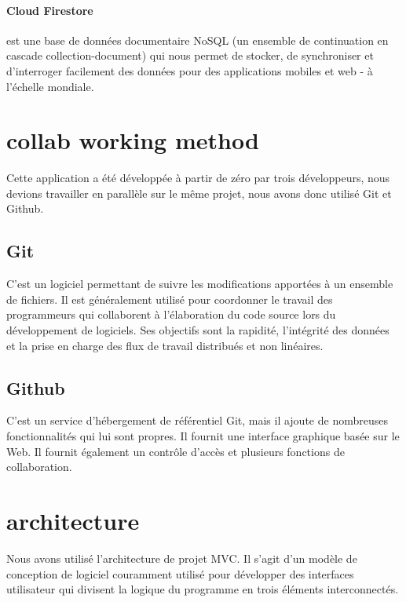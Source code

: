 \documentclass[a4paper, 10p]{report}
\begin{document}
				\paragraph*{Cloud Firestore} est une base de données documentaire NoSQL (un ensemble de continuation en cascade collection-document) qui nous permet de stocker, de synchroniser et d'interroger facilement des données pour des applications mobiles et web - à l'échelle mondiale.
	\section{collab working method}
		Cette application a été développée à partir de zéro par trois développeurs, nous devions travailler en parallèle sur le même projet, nous avons donc utilisé Git et Github.

		\subsection*{Git} C'est un logiciel permettant de suivre les modifications apportées à un ensemble de fichiers. Il est généralement utilisé pour coordonner le travail des programmeurs qui collaborent à l'élaboration du code source lors du développement de logiciels. Ses objectifs sont la rapidité, l'intégrité des données et la prise en charge des flux de travail distribués et non linéaires.

		\subsection*{Github} C'est un service d'hébergement de référentiel Git, mais il ajoute de nombreuses fonctionnalités qui lui sont propres. Il fournit une interface graphique basée sur le Web. Il fournit également un contrôle d'accès et plusieurs fonctions de collaboration.
	\section{architecture} %
		Nous avons utilisé l'architecture de projet MVC. Il s'agit d'un modèle de conception de logiciel couramment utilisé pour développer des interfaces utilisateur qui divisent la logique du programme en trois éléments interconnectés.
\end{document}

